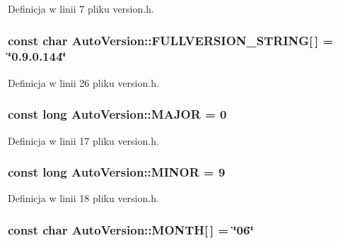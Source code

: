 Definicja w linii 7 pliku version.h.\hypertarget{a00019_2c666a4ee8f49f7647b06e6c526858ad}{
\subsubsection[{FULLVERSION\_\-STRING}]{\setlength{\rightskip}{0pt plus 5cm}const char {\bf AutoVersion::FULLVERSION\_\-STRING}\mbox{[}$\,$\mbox{]} = \char`\"{}0.9.0.144\char`\"{}}}
\label{dd/da2/a00019_2c666a4ee8f49f7647b06e6c526858ad}




Definicja w linii 26 pliku version.h.\hypertarget{a00019_85ad69390168fa80a3868ae22631b48c}{
\subsubsection[{MAJOR}]{\setlength{\rightskip}{0pt plus 5cm}const long {\bf AutoVersion::MAJOR} = 0}}
\label{dd/da2/a00019_85ad69390168fa80a3868ae22631b48c}




Definicja w linii 17 pliku version.h.\hypertarget{a00019_2c324b304c1d4c4d273f848c50679eb4}{
\subsubsection[{MINOR}]{\setlength{\rightskip}{0pt plus 5cm}const long {\bf AutoVersion::MINOR} = 9}}
\label{dd/da2/a00019_2c324b304c1d4c4d273f848c50679eb4}




Definicja w linii 18 pliku version.h.\hypertarget{a00019_c5504cfe250e5b6e09bde81a917c4349}{
\subsubsection[{MONTH}]{\setlength{\rightskip}{0pt plus 5cm}const char {\bf AutoVersion::MONTH}\mbox{[}$\,$\mbox{]} = \char`\"{}06\char`\"{}}}
\label{dd/da2/a00019_c5504cfe250e5b6e09bde81a917c4349}




